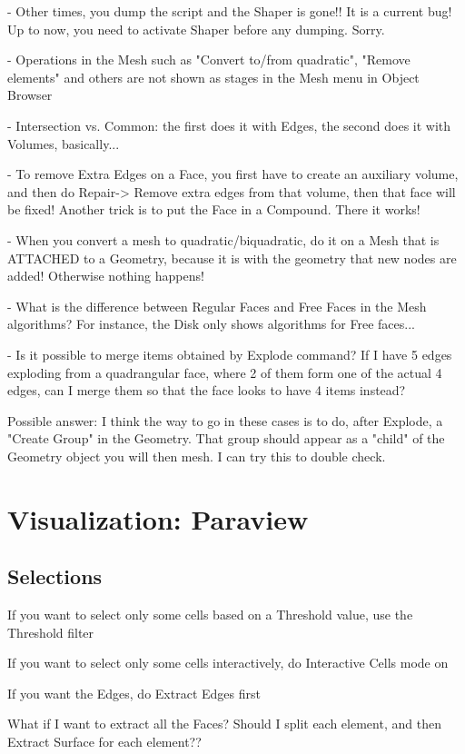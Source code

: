 \documentclass[10pt]{book}
\begin{document}
- Other times, you dump the script and the Shaper is gone!! It is a current bug! Up to now, you need to activate Shaper before any dumping. Sorry.

- Operations in the Mesh such as "Convert to/from quadratic", "Remove elements" and others
  are not shown as stages in the Mesh menu in Object Browser

- Intersection vs. Common: the first does it with Edges, the second does it with Volumes, basically...

- To remove Extra Edges on a Face, you first have to create an auxiliary volume, and then do Repair-> Remove extra edges from that volume,
  then that face will be fixed!
  Another trick is to put the Face in a Compound. There it works!

- When you convert a mesh to quadratic/biquadratic, do it on a Mesh that is ATTACHED to a Geometry, because it is with the geometry that new nodes are added! 
  Otherwise nothing happens!

- What is the difference between Regular Faces and Free Faces in the Mesh algorithms? For instance, the Disk only shows algorithms for Free faces...

- Is it possible to merge items obtained by Explode command? If I have 5 edges exploding from a quadrangular face,
  where 2 of them form one of the actual 4 edges, can I merge them so that the face looks to have 4 items instead?
    
  Possible answer: I think the way to go in these cases is to do, after Explode, a "Create Group" in the Geometry.
    That group should appear as a "child" of the Geometry object you will then mesh. I can try this to double check.


\part{Visualization: Paraview}


\chapter{Selections}


 If you want to select only some cells based on a Threshold value, use the Threshold filter

 If you want to select only some cells interactively, do Interactive Cells mode on
 
 If you want the Edges, do Extract Edges first
 
 What if I want to extract all the Faces? 
   Should I split each element, and then Extract Surface for each element??
\end{document}
